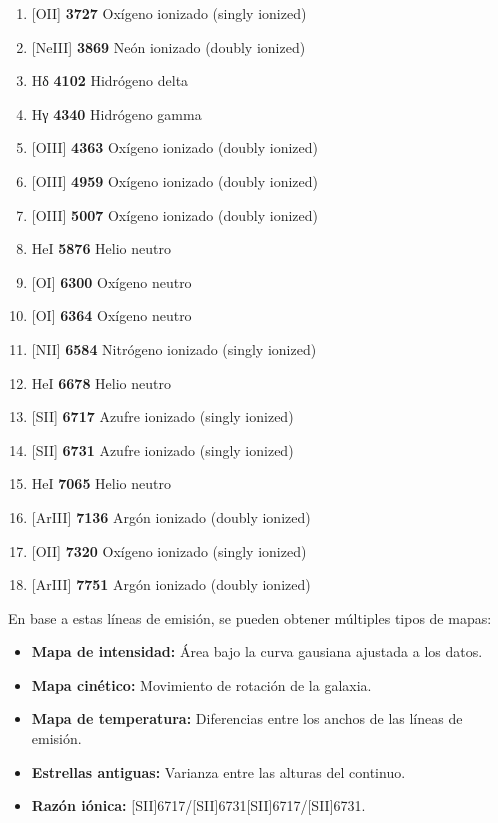 \documentclass[9pt,twocolumn,a4paper]{opticajnl}
\begin{document}
\begin{enumerate}
  \item {[OII] \textbf{3727} Oxígeno ionizado (singly ionized)}
  \item {[NeIII] \textbf{3869} Neón ionizado (doubly ionized)}
  \item {Hδ \textbf{4102} Hidrógeno delta}
  \item {Hγ \textbf{4340} Hidrógeno gamma}
  \item {[OIII] \textbf{4363} Oxígeno ionizado (doubly ionized)}
  \item {[OIII] \textbf{4959} Oxígeno ionizado (doubly ionized)}
  \item {[OIII] \textbf{5007} Oxígeno ionizado (doubly ionized)}
  \item {HeI \textbf{5876} Helio neutro}
  \item {[OI] \textbf{6300} Oxígeno neutro}
  \item {[OI] \textbf{6364} Oxígeno neutro}
  \item {[NII] \textbf{6584} Nitrógeno ionizado (singly ionized)}
  \item {HeI \textbf{6678} Helio neutro}
  \item {[SII] \textbf{6717} Azufre ionizado (singly ionized)}
  \item {[SII] \textbf{6731} Azufre ionizado (singly ionized)}
  \item {HeI \textbf{7065} Helio neutro}
  \item {[ArIII] \textbf{7136} Argón ionizado (doubly ionized)}
  \item {[OII] \textbf{7320} Oxígeno ionizado (singly ionized)}
  \item {[ArIII] \textbf{7751} Argón ionizado (doubly ionized)}
\end{enumerate}

En base a estas líneas de emisión, se pueden obtener múltiples tipos de mapas:

\begin{itemize}
\item \textbf{Mapa de intensidad:} Área bajo la curva gausiana ajustada a los datos.
\item \textbf{Mapa cinético:} Movimiento de rotación de la galaxia.
\item \textbf{Mapa de temperatura:} Diferencias entre los anchos de las líneas de emisión.
\item \textbf{Estrellas antiguas:} Varianza entre las alturas del continuo.
\item \textbf{Razón iónica:} [SII]6717/[SII]6731[SII]6717/[SII]6731.
\end{itemize}
\end{document}
